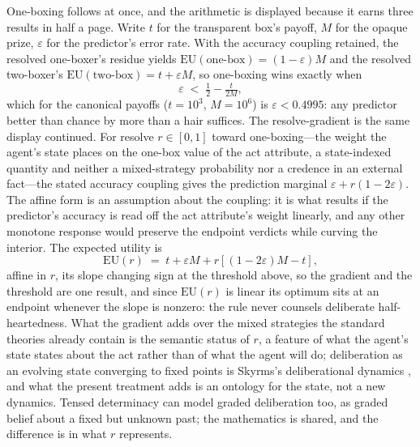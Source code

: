 \noindent One-boxing follows at once, and the arithmetic is displayed because it earns three results in half a page. Write $t$ for the transparent box's payoff, $M$ for the opaque prize, $\varepsilon$ for the predictor's error rate. With the accuracy coupling retained, the resolved one-boxer's residue yields $\mathrm{EU}(\text{one-box}) = (1-\varepsilon)M$ and the resolved two-boxer's $\mathrm{EU}(\text{two-box}) = t + \varepsilon M$, so one-boxing wins exactly when
\begin{equation}
\varepsilon \;<\; \tfrac{1}{2} - \tfrac{t}{2M},
\end{equation}
which for the canonical payoffs ($t = 10^3$, $M = 10^6$) is $\varepsilon < 0.4995$: any predictor better than chance by more than a hair suffices. The resolve-gradient is the same display continued. For resolve $r \in [0,1]$ toward one-boxing---the weight the agent's state places on the one-box value of the act attribute, a state-indexed quantity and neither a mixed-strategy probability nor a credence in an external fact---the stated accuracy coupling gives the prediction marginal $\varepsilon + r(1-2\varepsilon)$. The affine form is an assumption about the coupling: it is what results if the predictor's accuracy is read off the act attribute's weight linearly, and any other monotone response would preserve the endpoint verdicts while curving the interior. The expected utility is
\begin{equation}
\mathrm{EU}(r) \;=\; t + \varepsilon M + r\left[(1-2\varepsilon)M - t\right],
\end{equation}
affine in $r$, its slope changing sign at the threshold above, so the gradient and the threshold are one result, and since $\mathrm{EU}(r)$ is linear its optimum sits at an endpoint whenever the slope is nonzero: the rule never counsels deliberate half-heartedness. What the gradient adds over the mixed strategies the standard theories already contain is the semantic status of $r$, a feature of what the agent's state states about the act rather than of what the agent will do; deliberation as an evolving state converging to fixed points is Skyrms's deliberational dynamics \cite{skyrms1990dynamics}, and what the present treatment adds is an ontology for the state, not a new dynamics. Tensed determinacy can model graded deliberation too, as graded belief about a fixed but unknown past; the mathematics is shared, and the difference is in what $r$ represents.

